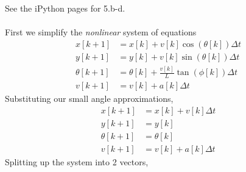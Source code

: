\documentclass[]{article}
\begin{document}
See the iPython pages for 5.b-d. \\
\\
First we simplify the \emph{nonlinear} system of equations
\begin{align}
	x[k + 1] &= x[k] + v[k] \cos(\theta[k]) \Delta t \\
	y[k + 1] &= y[k] + v[k] \sin(\theta[k]) \Delta t \\
	\theta[k + 1] &= \theta[k] + \frac{v[k]}{L} \tan(\phi[k]) \Delta t \\ \label{eq:4b-turning-angle}
	v[k + 1] &= v[k] + a[k] \Delta t
\end{align}
Substituting our small angle approximations,
\begin{align}
	x[k + 1] &= x[k] + v[k]\Delta t \\
	y[k + 1] &= y[k] \\
	\theta[k + 1] &= \theta[k] \\
	v[k + 1] &= v[k] + a[k] \Delta t
\end{align}
Splitting up the system into 2 vectors, 
\end{document}
